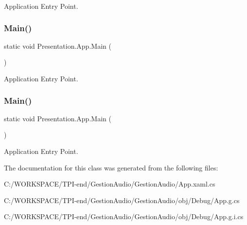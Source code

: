 Application Entry Point. 

\mbox{\label{class_presentation_1_1_app_a8a6ad434f351a99acb7059899b1f273c}} 
\subsubsection{\texorpdfstring{Main()}{Main()}\hspace{0.1cm}{\footnotesize\ttfamily [3/4]}}
{\footnotesize\ttfamily static void Presentation.\+App.\+Main (\begin{DoxyParamCaption}{ }\end{DoxyParamCaption})\hspace{0.3cm}{\ttfamily [static]}}



Application Entry Point. 

\mbox{\label{class_presentation_1_1_app_a8a6ad434f351a99acb7059899b1f273c}} 
\subsubsection{\texorpdfstring{Main()}{Main()}\hspace{0.1cm}{\footnotesize\ttfamily [4/4]}}
{\footnotesize\ttfamily static void Presentation.\+App.\+Main (\begin{DoxyParamCaption}{ }\end{DoxyParamCaption})\hspace{0.3cm}{\ttfamily [static]}}



Application Entry Point. 



The documentation for this class was generated from the following files\+:\begin{DoxyCompactItemize}
\item 
C\+:/\+W\+O\+R\+K\+S\+P\+A\+C\+E/\+T\+P\+I-\/end/\+Gestion\+Audio/\+Gestion\+Audio/App.\+xaml.\+cs\item 
C\+:/\+W\+O\+R\+K\+S\+P\+A\+C\+E/\+T\+P\+I-\/end/\+Gestion\+Audio/\+Gestion\+Audio/obj/\+Debug/App.\+g.\+cs\item 
C\+:/\+W\+O\+R\+K\+S\+P\+A\+C\+E/\+T\+P\+I-\/end/\+Gestion\+Audio/\+Gestion\+Audio/obj/\+Debug/App.\+g.\+i.\+cs\end{DoxyCompactItemize}
